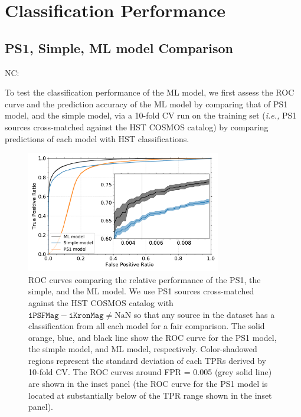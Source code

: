 \documentclass[twocolumn]{aastex62}
\newcommand{\NC}[1]{{\color{brown} NC: {#1}}}
\begin{document}
\section{Classification Performance}

\subsection{PS1, Simple, ML model Comparison}\label{sec:comp_hst}
\NC{To test the classification performance of the ML model, 
we first assess the ROC curve and the prediction accuracy 
of the ML model by comparing that of PS1 model, and the simple model, 
via a 10-fold CV run on the training set ({\it i.e.,} PS1 sources cross-matched against the HST COSMOS catalog) 
by comparing predictions of each model with HST classifications. 
\begin{figure}[t]
 \centering
  \includegraphics[width=3.35in, bb = 0 0 576 360]{./Figures/CV_ROC_HST.pdf}
  \caption{
  ROC curves comparing the relative performance of the PS1, the simple, and the ML model. 
  We use PS1 sources cross-matched against the HST COSMOS catalog with 
  $\mathtt{iPSFMag} - \mathtt{iKronMag} \neq \mathrm{NaN}$ 
  so that any source in the dataset has a classification from all each model 
  for a fair comparison. 
  The solid orange, blue, and black line show the ROC curve 
  for the PS1 model, the simple model, and ML model, respectively. 
  Color-shadowed regions represent the standard deviation of each TPRs derived by 10-fold CV. 
  The ROC curves around FPR = 0.005 (grey solid line) are shown in the inset panel 
  (the ROC curve for the PS1 model is located at substantially below of the TPR range shown in the inset panel). 
  }
  \label{fig:cvroc_hst}
\end{figure}

}
\end{document}
